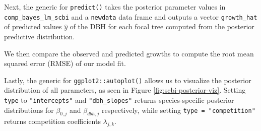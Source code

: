 \documentclass[12pt]{article}
\newenvironment{Shaded}{\begin{snugshade}}{\end{snugshade}}
\newcommand{\CommentTok}[1]{\textcolor[rgb]{0.56,0.35,0.01}{\textit{#1}}}
\newcommand{\DataTypeTok}[1]{\textcolor[rgb]{0.13,0.29,0.53}{#1}}
\newcommand{\KeywordTok}[1]{\textcolor[rgb]{0.13,0.29,0.53}{\textbf{#1}}}
\newcommand{\NormalTok}[1]{#1}
\newcommand{\OperatorTok}[1]{\textcolor[rgb]{0.81,0.36,0.00}{\textbf{#1}}}
\newcommand{\StringTok}[1]{\textcolor[rgb]{0.31,0.60,0.02}{#1}}
\begin{document}
Next, the generic for \texttt{predict()} takes the posterior parameter
values in \texttt{comp\_bayes\_lm\_scbi} and a \texttt{newdata} data
frame and outputs a vector \texttt{growth\_hat} of predicted values
\(\widehat{y}\) of the DBH for each focal tree computed from the
posterior predictive distribution.

\begin{Shaded}
\end{Shaded}

\begin{Shaded}
\end{Shaded}

We then compare the observed and predicted growths to compute the root
mean squared error (RMSE) of our model fit.

\begin{Shaded}
\end{Shaded}

Lastly, the generic for \texttt{ggplot2::autoplot()} allows us to
visualize the posterior distribution of all parameters, as seen in
Figure \ref{fig:scbi-posterior-viz}. Setting \texttt{type} to
\texttt{"intercepts"} and \texttt{"dbh\_slopes"} returns
species-specific posterior distributions for \(\beta_{0,j}\) and
\(\beta_{dbh,j}\) respectively, while setting
\texttt{type\ =\ "competition"} returns competition coefficients
\(\lambda_{j,k}\).
\end{document}
